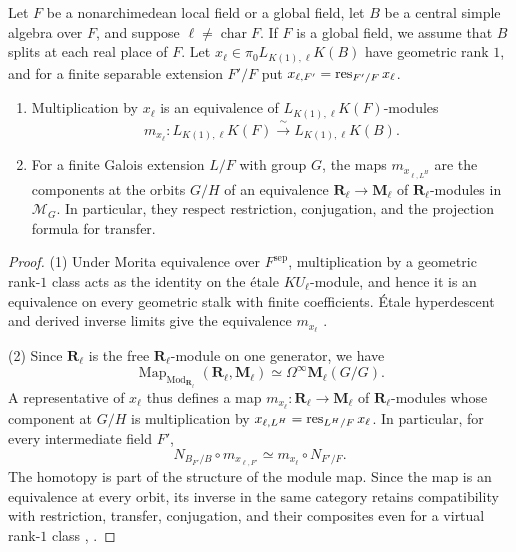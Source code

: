 \begin{lemma}\label{lem:paper-etale-rank-one}
Let $F$ be a nonarchimedean local field or a global field, let $B$ be a central simple algebra over $F$, and suppose $\ell\ne\operatorname{char}F$.
If $F$ is a global field, we assume that $B$ splits at each real place of $F$.
Let $x_\ell\in\pi_0L_{K(1),\ell}K(B)$ have geometric rank $1$, and for a finite separable extension $F'/F$ put $x_{\ell,F'}=\operatorname{res}_{F'/F}x_\ell$.
\begin{enumerate}
\item Multiplication by $x_\ell$ is an equivalence of $L_{K(1),\ell}K(F)$-modules
\[
 m_{x_\ell}\colon L_{K(1),\ell}K(F)\xrightarrow{\ \sim\ }L_{K(1),\ell}K(B).
\]
\item For a finite Galois extension $L/F$ with group $G$, the maps $m_{x_{\ell,L^H}}$ are the components at the orbits $G/H$ of an equivalence $\mathbf R_\ell\to\mathbf M_\ell$ of $\mathbf R_\ell$-modules in $\mathscr M_G$.
In particular, they respect restriction, conjugation, and the projection formula for transfer.
\end{enumerate}
\end{lemma}
\begin{proof}
(1) Under Morita equivalence over $F^{\mathrm{sep}}$, multiplication by a geometric rank-$1$ class acts as the identity on the \'etale $KU_\ell$-module, and hence it is an equivalence on every geometric stalk with finite coefficients.
\'Etale hyperdescent and derived inverse limits give the equivalence $m_{x_\ell}$ \cite{ClausenMathew}.

(2) Since $\mathbf R_\ell$ is the free $\mathbf R_\ell$-module on one generator, we have
\[
 \operatorname{Map}_{\operatorname{Mod}_{\mathbf R_\ell}}
       (\mathbf R_\ell,\mathbf M_\ell)
 \simeq\Omega^\infty\mathbf M_\ell(G/G).
\]
A representative of $x_\ell$ thus defines a map $m_{x_\ell}\colon\mathbf R_\ell\to\mathbf M_\ell$ of $\mathbf R_\ell$-modules whose component at $G/H$ is multiplication by $x_{\ell,L^H}=\operatorname{res}_{L^H/F}x_\ell$.
In particular, for every intermediate field $F'$,
\[
 N_{B_{F'}/B}\circ m_{x_{\ell,F'}}\simeq m_{x_\ell}\circ N_{F'/F}.
\]
The homotopy is part of the structure of the module map.
Since the map is an equivalence at every orbit, its inverse in the same category retains compatibility with restriction, transfer, conjugation, and their composites even for a virtual rank-$1$ class \cite{BarwickSpectralMackey}, \cite[Sections 3--5, Construction 9.7]{BGS2017}.
\end{proof}


